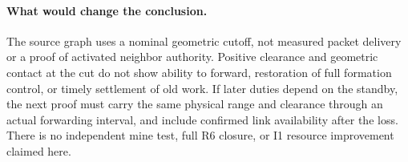 \documentclass[11pt]{article}
\begin{document}
\paragraph{What would change the conclusion.}
The source graph uses a nominal geometric cutoff, not measured packet delivery or a proof of activated neighbor authority. Positive clearance and geometric contact at the cut do not show ability to forward, restoration of full formation control, or timely settlement of old work. If later duties depend on the standby, the next proof must carry the same physical range and clearance through an actual forwarding interval, and include confirmed link availability after the loss. There is no independent mine test, full R6 closure, or I1 resource improvement claimed here.
\end{document}
